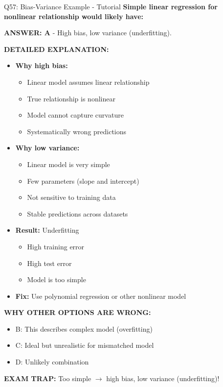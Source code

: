 \documentclass[8pt]{beamer}
\begin{document}
	\begin{frame}{Q57: Bias-Variance Example - Tutorial}
		\fontsize{6.5}{7.5}\selectfont
		\textbf{Simple linear regression for nonlinear relationship would likely have:}
		
		\vspace{0.05cm}
		\textcolor{myblue}{\textbf{ANSWER: A}} - High bias, low variance (underfitting).
		
		\vspace{0.05cm}
		\textbf{DETAILED EXPLANATION:}
		\begin{itemize}
			\item \textbf{Why high bias:}
			\begin{itemize}
				\item Linear model assumes linear relationship
				\item True relationship is nonlinear
				\item Model cannot capture curvature
				\item Systematically wrong predictions
			\end{itemize}
			\item \textbf{Why low variance:}
			\begin{itemize}
				\item Linear model is very simple
				\item Few parameters (slope and intercept)
				\item Not sensitive to training data
				\item Stable predictions across datasets
			\end{itemize}
			\item \textbf{Result:} Underfitting
			\begin{itemize}
				\item High training error
				\item High test error
				\item Model is too simple
			\end{itemize}
			\item \textbf{Fix:} Use polynomial regression or other nonlinear model
		\end{itemize}
		
		\vspace{0.05cm}
		\textcolor{myred}{\textbf{WHY OTHER OPTIONS ARE WRONG:}}
		\begin{itemize}
			\item \textcolor{myred}{B:} This describes complex model (overfitting)
			\item \textcolor{myred}{C:} Ideal but unrealistic for mismatched model
			\item \textcolor{myred}{D:} Unlikely combination
		\end{itemize}
		
		\textcolor{myred}{\textbf{EXAM TRAP:}} Too simple $\to$ high bias, low variance (underfitting)!
	\end{frame}
	
\end{document}
